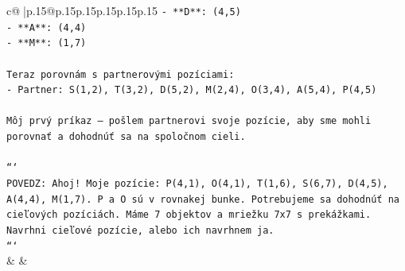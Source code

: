 \documentclass{article}
\begin{document}
{\begin{supertabular}{c@{$\;$}|p{.15\linewidth}@{}p{.15\linewidth}p{.15\linewidth}p{.15\linewidth}p{.15\linewidth}p{.15\linewidth}}
{{{\texttt{{-} **D**: (4,5)} \\
\texttt{{-} **A**: (4,4)} \\
\texttt{{-} **M**: (1,7)} \\
\\ 
\texttt{Teraz porovnám s partnerovými pozíciami:} \\
\texttt{{-} Partner: S(1,2), T(3,2), D(5,2), M(2,4), O(3,4), A(5,4), P(4,5)} \\
\\ 
\texttt{Môj prvý príkaz — pošlem partnerovi svoje pozície, aby sme mohli porovnať a dohodnúť sa na spoločnom cieli.} \\
\\ 
\texttt{```} \\
\texttt{POVEDZ: Ahoj! Moje pozície: P(4,1), O(4,1), T(1,6), S(6,7), D(4,5), A(4,4), M(1,7). P a O sú v rovnakej bunke. Potrebujeme sa dohodnúť na cieľových pozíciách. Máme 7 objektov a mriežku 7x7 s prekážkami. Navrhni cieľové pozície, alebo ich navrhnem ja.} \\
\texttt{```} \\
            }
        }
    }
    & & \\ \\


\end{supertabular}}
\end{document}
